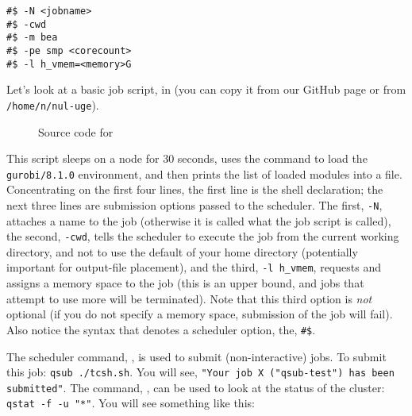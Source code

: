 \documentclass{easychair}
\begin{document}
\begin{verbatim}
#$ -N <jobname>
#$ -cwd
#$ -m bea
#$ -pe smp <corecount>
#$ -l h_vmem=<memory>G
\end{verbatim}


Let's look at a basic job script,  in 
(you can copy it from our GitHub page or from \texttt{/home/n/nul-uge}).

\begin{figure}[htpb]
    
    \caption{Source code for }
	\label{fig:tcsh.sh}
\end{figure}

This script sleeps on a node for 30 seconds, uses the  command 
to load the \texttt{gurobi/8.1.0} environment, and then prints the list of 
loaded modules into a file. Concentrating on the first four lines, the first 
line is the shell declaration; the next three lines are submission options 
passed to the scheduler. The first, \texttt{-N}, attaches a name to the job
(otherwise it is called what the job script is called), the second, \texttt{-cwd},
tells the scheduler to execute the job from the current working 
directory, and not to use the default of your home directory (potentially 
important for output-file placement), and the third, \texttt{-l h\_vmem}, 
requests and assigns a memory space to the job (this is an upper bound, and 
jobs that attempt to use more will be terminated). Note that this third 
option is \emph{not} optional (if you do not specify a memory space, 
submission of the job will fail). Also notice the syntax that denotes a 
scheduler option, the, \texttt{\#\$}.

The scheduler command, , is used to submit (non-interactive) jobs. 
To submit this job: \texttt{qsub ./tcsh.sh}. You will see, \texttt{"Your job 
X ("qsub-test") has been submitted"}. The command, , can be used 
to look at the status of the cluster: \texttt{qstat -f -u "*"}. You will see 
something like this: 
\end{document}
